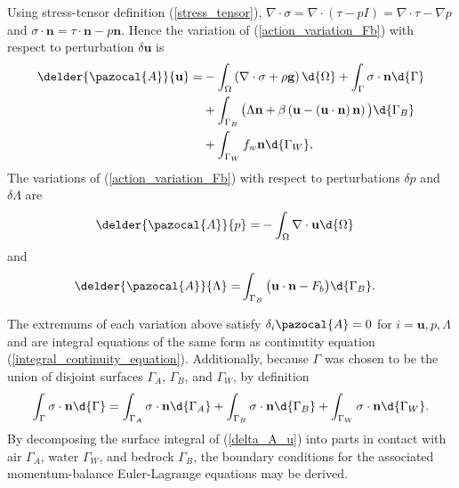 Using stress-tensor definition (\ref{stress_tensor}), $\nabla \cdot \sigma = \nabla \cdot \left( \tau - p I \right) = \nabla \cdot \tau - \nabla p$ and $\sigma \cdot \mathbf{n} = \tau \cdot \mathbf{n} - p \mathbf{n}$.  Hence the variation of (\ref{action_variation_Fb}) with respect to perturbation $\delta \mathbf{u}$ is
\begin{align}
  \label{delta_A_u}
  \delder{\pazocal{A}}{\mathbf{u}} = 
  &- \int_{\Omega} \left( \nabla \cdot \sigma + \rho \mathbf{g} \right) \d{\Omega}
   + \int_{\Gamma} \sigma \cdot \mathbf{n} \d{\Gamma} \notag \\
  &+ \int_{\Gamma_B} \big( \Lambda \mathbf{n} + \beta \left( \mathbf{u} - \left( \mathbf{u} \cdot \mathbf{n} \right) \mathbf{n} \right) \big) \d{\Gamma_B} \notag \\
  &+ \int_{\Gamma_W} f_w \mathbf{n} \d{\Gamma_W},
\end{align}
The variations of (\ref{action_variation_Fb}) with respect to perturbations $\delta p$ and $\delta \Lambda$ are
\begin{align}
  \label{delta_A_p}
  \delder{\pazocal{A}}{p} =
  &- \int_{\Omega} \nabla \cdot \mathbf{u} \d{\Omega}
\end{align}
and
\begin{align}
  \label{delta_A_Lambda}
  \delder{\pazocal{A}}{\Lambda} =
  & \int_{\Gamma_B} \big( \mathbf{u} \cdot \mathbf{n} - F_b \big) \d{\Gamma_B}.
\end{align}

The extremums of each variation above satisfy $\delta_i \pazocal{A} = 0$ for $i = \mathbf{u}, p, \Lambda$ and are integral equations of the same form as continutity equation (\ref{integral_continuity_equation}).
Additionally, because $\Gamma$ was chosen to be the union of disjoint surfaces $\Gamma_A$, $\Gamma_B$, and $\Gamma_W$, by definition
\begin{align}
  \label{surface_stress_balance}
  \int_{\Gamma} \sigma \cdot \mathbf{n} \d{\Gamma} = \int_{\Gamma_A} \sigma \cdot \mathbf{n} \d{\Gamma_A} + \int_{\Gamma_B} \sigma \cdot \mathbf{n} \d{\Gamma_B} + \int_{\Gamma_W} \sigma \cdot \mathbf{n} \d{\Gamma_W}.
\end{align}
By decomposing the surface integral of (\ref{delta_A_u}) into parts in contact with air $\Gamma_A$, water $\Gamma_W$, and bedrock $\Gamma_B$, the boundary conditions for the associated momentum-balance Euler-Lagrange equations may be derived.

